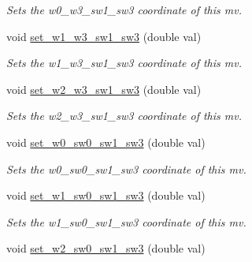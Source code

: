 \begin{DoxyCompactItemize}
\begin{DoxyCompactList}\small\item\em Sets the w0\-\_\-w3\-\_\-sw1\-\_\-sw3 coordinate of this mv. \end{DoxyCompactList}\item 
\hypertarget{classe3ga_1_1mv_a18b24f2d1005ccd5cfe6eb37763a4a55}{void \hyperlink{classe3ga_1_1mv_a18b24f2d1005ccd5cfe6eb37763a4a55}{set\-\_\-w1\-\_\-w3\-\_\-sw1\-\_\-sw3} (double val)}\label{classe3ga_1_1mv_a18b24f2d1005ccd5cfe6eb37763a4a55}

\begin{DoxyCompactList}\small\item\em Sets the w1\-\_\-w3\-\_\-sw1\-\_\-sw3 coordinate of this mv. \end{DoxyCompactList}\item 
\hypertarget{classe3ga_1_1mv_a57a1fade68e204f7ef2cdc5a0d39e0c0}{void \hyperlink{classe3ga_1_1mv_a57a1fade68e204f7ef2cdc5a0d39e0c0}{set\-\_\-w2\-\_\-w3\-\_\-sw1\-\_\-sw3} (double val)}\label{classe3ga_1_1mv_a57a1fade68e204f7ef2cdc5a0d39e0c0}

\begin{DoxyCompactList}\small\item\em Sets the w2\-\_\-w3\-\_\-sw1\-\_\-sw3 coordinate of this mv. \end{DoxyCompactList}\item 
\hypertarget{classe3ga_1_1mv_ad9ff4089eb3b1db24778b8dbd254b010}{void \hyperlink{classe3ga_1_1mv_ad9ff4089eb3b1db24778b8dbd254b010}{set\-\_\-w0\-\_\-sw0\-\_\-sw1\-\_\-sw3} (double val)}\label{classe3ga_1_1mv_ad9ff4089eb3b1db24778b8dbd254b010}

\begin{DoxyCompactList}\small\item\em Sets the w0\-\_\-sw0\-\_\-sw1\-\_\-sw3 coordinate of this mv. \end{DoxyCompactList}\item 
\hypertarget{classe3ga_1_1mv_aa1faaf4058cec5174bffd780a44253d2}{void \hyperlink{classe3ga_1_1mv_aa1faaf4058cec5174bffd780a44253d2}{set\-\_\-w1\-\_\-sw0\-\_\-sw1\-\_\-sw3} (double val)}\label{classe3ga_1_1mv_aa1faaf4058cec5174bffd780a44253d2}

\begin{DoxyCompactList}\small\item\em Sets the w1\-\_\-sw0\-\_\-sw1\-\_\-sw3 coordinate of this mv. \end{DoxyCompactList}\item 
\hypertarget{classe3ga_1_1mv_a7dd22e004779799b92b9dc947541a55d}{void \hyperlink{classe3ga_1_1mv_a7dd22e004779799b92b9dc947541a55d}{set\-\_\-w2\-\_\-sw0\-\_\-sw1\-\_\-sw3} (double val)}\label{classe3ga_1_1mv_a7dd22e004779799b92b9dc947541a55d}


\end{DoxyCompactItemize}

